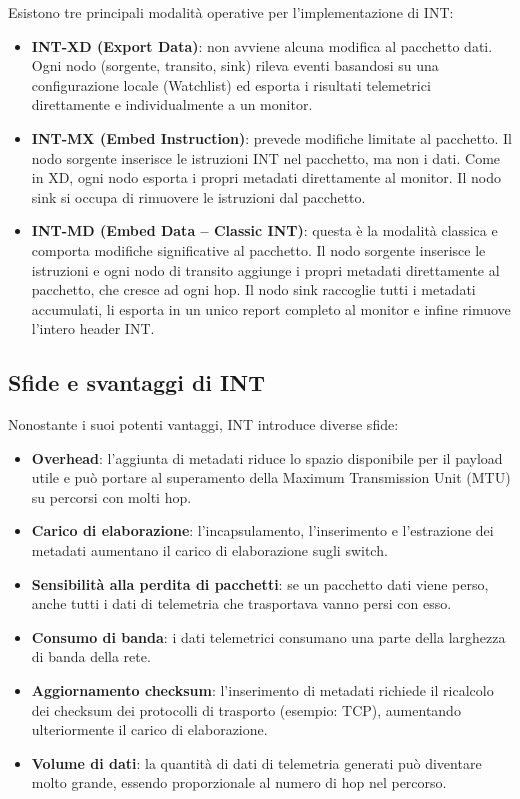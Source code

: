 Esistono tre principali modalità operative per l'implementazione di INT:

\begin{itemize}
\item \textbf{INT-XD (Export Data)}: non avviene alcuna modifica al pacchetto
dati. Ogni nodo (sorgente, transito, sink) rileva eventi basandosi su una
configurazione locale (Watchlist) ed esporta i risultati telemetrici
direttamente e individualmente a un monitor.
\item \textbf{INT-MX (Embed Instruction)}: prevede modifiche limitate al
pacchetto. Il nodo sorgente inserisce le istruzioni INT nel pacchetto, ma
non i dati. Come in XD, ogni nodo esporta i propri metadati direttamente
al monitor. Il nodo sink si occupa di rimuovere le istruzioni dal pacchetto.
\item \textbf{INT-MD (Embed Data -- Classic INT)}: questa è la modalità classica
e comporta modifiche significative al pacchetto. Il nodo sorgente inserisce
le istruzioni e ogni nodo di transito aggiunge i propri metadati direttamente
al pacchetto, che cresce ad ogni hop. Il nodo sink raccoglie tutti i metadati
accumulati, li esporta in un unico report completo al monitor e infine rimuove
l'intero header INT.
\end{itemize}

\subsection{Sfide e svantaggi di INT}

Nonostante i suoi potenti vantaggi, INT introduce diverse sfide:

\begin{itemize}
\item \textbf{Overhead}: l'aggiunta di metadati riduce lo spazio disponibile
per il payload utile e può portare al superamento della Maximum Transmission
Unit (MTU) su percorsi con molti hop.
\item \textbf{Carico di elaborazione}: l'incapsulamento, l'inserimento e
l'estrazione dei metadati aumentano il carico di elaborazione sugli switch.
\item \textbf{Sensibilità alla perdita di pacchetti}: se un pacchetto dati
viene perso, anche tutti i dati di telemetria che trasportava vanno persi
con esso.
\item \textbf{Consumo di banda}: i dati telemetrici consumano una parte della
larghezza di banda della rete.
\item \textbf{Aggiornamento checksum}: l'inserimento di metadati richiede il
ricalcolo dei checksum dei protocolli di trasporto (esempio: TCP), aumentando
ulteriormente il carico di elaborazione.
\item \textbf{Volume di dati}: la quantità di dati di telemetria generati può
diventare molto grande, essendo proporzionale al numero di hop nel percorso.
\end{itemize}

